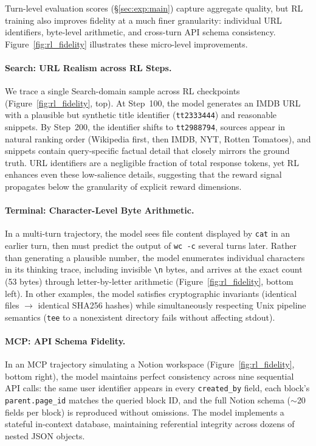\documentclass{llmxive}
\begin{document}
Turn-level evaluation scores (\S\ref{sec:exp:main}) capture aggregate quality, but RL training also improves fidelity at a much finer granularity: individual URL identifiers, byte-level arithmetic, and cross-turn API schema consistency.
Figure~\ref{fig:rl_fidelity} illustrates these micro-level improvements.

\paragraph{Search: URL Realism across RL Steps.}
We trace a single Search-domain sample across RL checkpoints (Figure~\ref{fig:rl_fidelity}, top).
At Step~100, the model generates an IMDB URL with a plausible but synthetic title identifier (\texttt{tt2333444}) and reasonable snippets.
By Step~200, the identifier shifts to \texttt{tt2988794}, sources appear in natural ranking order (Wikipedia first, then IMDB, NYT, Rotten Tomatoes), and snippets contain query-specific factual detail that closely mirrors the ground truth.
URL identifiers are a negligible fraction of total response tokens, yet RL enhances even these low-salience details, suggesting that the reward signal propagates below the granularity of explicit reward dimensions.

\paragraph{Terminal: Character-Level Byte Arithmetic.}
In a multi-turn trajectory, the model sees file content displayed by \texttt{cat} in an earlier turn, then must predict the output of \texttt{wc -c} several turns later.
Rather than generating a plausible number, the model enumerates individual characters in its thinking trace, including invisible \texttt{\textbackslash n} bytes, and arrives at the exact count (53 bytes) through letter-by-letter arithmetic (Figure~\ref{fig:rl_fidelity}, bottom left).
In other examples, the model satisfies cryptographic invariants (identical files $\to$ identical SHA256 hashes) while simultaneously respecting Unix pipeline semantics (\texttt{tee} to a nonexistent directory fails without affecting stdout).

\paragraph{MCP: API Schema Fidelity.}
In an MCP trajectory simulating a Notion workspace (Figure~\ref{fig:rl_fidelity}, bottom right), the model maintains perfect consistency across nine sequential API calls: the same user identifier appears in every \texttt{created\_by} field, each block's \texttt{parent.page\_id} matches the queried block ID, and the full Notion schema ($\sim$20 fields per block) is reproduced without omissions.
The model implements a stateful in-context database, maintaining referential integrity across dozens of nested JSON objects.
\end{document}
